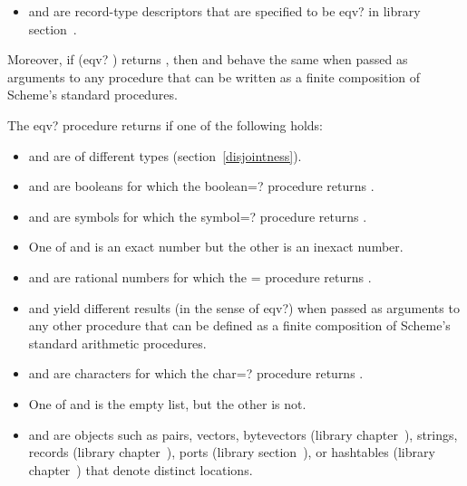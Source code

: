 \begin{entry}{%
}
\begin{itemize}
\item {} and  are record-type descriptors that are
  specified to be {\cf eqv?} in library
  section~.
\end{itemize}

Moreover, if {\cf (eqv?  )} returns \schtrue,
then  and  behave the same when passed as
arguments to any procedure that can be written as a finite composition
of Scheme's standard procedures.

The {\cf eqv?} procedure returns \schfalse{} if one of the following holds:

\begin{itemize}
\item {} and  are of different types
(section~\ref{disjointness}).

\item {} and  are booleans for which the {\cf
    boolean=?} procedure returns \schfalse.

\item {} and  are symbols for which the {\cf
    symbol=?} procedure returns \schfalse.

\item One of  and  is an exact number but the other is
        an inexact number.

\item {} and  are rational numbers for which the {\cf =} procedure
  returns \schfalse{}.

\item {} and  yield different results (in the sense of
  {\cf eqv?}) when passed as arguments to any other procedure
  that can be defined as a finite composition of Scheme's
  standard arithmetic procedures.

\item {} and  are characters for which the {\cf char=?}
  procedure returns \schfalse{}.

\item One of  and  is the empty list, but the other is not.

\item {} and  are objects such as pairs, vectors,
  bytevectors (library
  chapter~), strings,
  records (library
  chapter~), ports (library
  section~), or hashtables
  (library chapter~) that
  denote distinct locations.


\end{itemize}
\end{entry}
